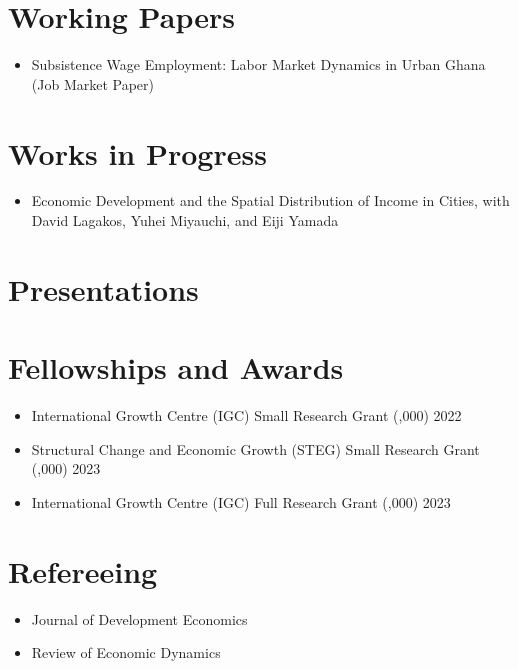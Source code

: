 \documentclass[12pt]{article}
\newenvironment{customitemize}
{ \begin{itemize}[
	leftmargin=\parindent,
	itemindent=-0.5\parindent,
	topsep = 0pt, 
	itemsep = -1pt, 
	label={}] }
{\end{itemize} }
\begin{document}
\section*{Working Papers}
\begin{customitemize}
	\item Subsistence Wage Employment: Labor Market Dynamics in Urban Ghana (Job Market Paper)
\end{customitemize}
\section*{Works in Progress}

\begin{customitemize}
	\item Economic Development and the Spatial Distribution of Income in Cities, with David Lagakos, Yuhei Miyauchi, and Eiji Yamada
\end{customitemize}

\section*{Presentations}
\vspace{5pt}


\section*{Fellowships and Awards}


\begin{customitemize}
	\item International Growth Centre (IGC) Small Research Grant (,000) \hfill 2022
	\item Structural Change and Economic Growth (STEG) Small Research Grant (,000) \hfill 2023
	\item International Growth Centre (IGC) Full Research Grant (,000) \hfill 2023
\end{customitemize}

\section*{Refereeing}


\begin{customitemize}
	\item Journal of Development Economics
	\item Review of Economic Dynamics
\end{customitemize}
\end{document}
